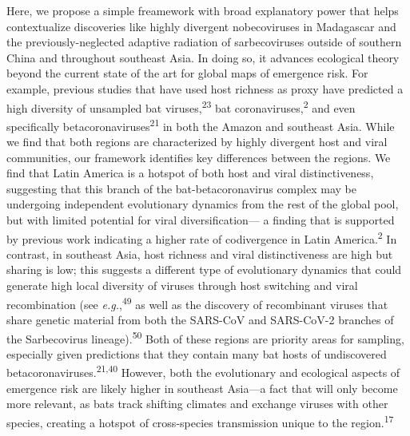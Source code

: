 \documentclass[10pt,oneside]{article}
\begin{document}
Here, we propose a simple freamework with broad explanatory power that
helps contextualize discoveries like highly divergent nobecoviruses in
Madagascar and the previously-neglected adaptive radiation of
sarbecoviruses outside of southern China and throughout southeast Asia.
In doing so, it advances ecological theory beyond the current state of
the art for global maps of emergence risk. For example, previous studies
that have used host richness as proxy have predicted a high diversity of
unsampled bat viruses,\textsuperscript{23} bat
coronaviruses,\textsuperscript{2} and even specifically
betacoronaviruses\textsuperscript{21} in both the Amazon and southeast
Asia. While we find that both regions are characterized by highly
divergent host and viral communities, our framework identifies key
differences between the regions. We find that Latin America is a hotspot
of both host and viral distinctiveness, suggesting that this branch of
the bat-betacoronavirus complex may be undergoing independent
evolutionary dynamics from the rest of the global pool, but with limited
potential for viral diversification--- a finding that is supported by
previous work indicating a higher rate of codivergence in Latin
America.\textsuperscript{2} In contrast, in southeast Asia, host
richness and viral distinctiveness are high but sharing is low; this
suggests a different type of evolutionary dynamics that could generate
high local diversity of viruses through host switching and viral
recombination (see \emph{e.g.},\textsuperscript{49} as well as the
discovery of recombinant viruses that share genetic material from both
the SARS-CoV and SARS-CoV-2 branches of the Sarbecovirus
lineage).\textsuperscript{50} Both of these regions are priority areas
for sampling, especially given predictions that they contain many bat
hosts of undiscovered betacoronaviruses.\textsuperscript{21,40} However,
both the evolutionary and ecological aspects of emergence risk are
likely higher in southeast Asia---a fact that will only become more
relevant, as bats track shifting climates and exchange viruses with
other species, creating a hotspot of cross-species transmission unique
to the region.\textsuperscript{17}
\end{document}
